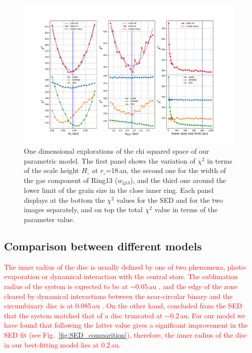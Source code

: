 \documentclass[fleqn,usenatbib,useAMS]{mnras}
\newcommand{\red}[1]{\textcolor{red}{#1}}
\begin{document}
\begin{figure}
	\includegraphics[width=\textwidth]{plot_chi_squared_all.pdf}
        \caption{One dimensional explorations of the chi squared space of our parametric model. The first panel shows the variation of $\chi^2$ in terms of the scale height $H_\circ$ at $r_\circ$=18\,au, the second one for the width of the gas component of Ring13 ($w_{\mathrm{g13}}$), and the third one around the lower limit of the grain size in the close inner ring. Each panel displays at the bottom the $\chi^2$ values for the SED and for the two images separately, and on top the total $\chi^2$ value in terms of the parameter value.}
    \label{fig:chi}
\end{figure}

\subsection{Comparison between different models}\label{sec:A2}

\red{The inner radius of the disc is usually defined by one of two phenomena, photo-evaporation or dynamical interaction with the central stars. The sublimation radius of the system is expected to be at $\sim$0.05\,au \citep[$R_{\mathrm{sub}}=0.07\sqrt{L_*(L_{\sun})}$,][]{Francis_2020}, and the edge of the zone cleared by dynamical interactions between the near-circular binary and the circumbinary disc is at 0.085\,au \citep[$r=2.08a$,][]{Art_Lu}. On the other hand, \citet{Jensen_97} concluded from the SED that the system matched that of a disc truncated at $\sim$0.2\,au. For our model we have found that following the latter value gives a significant improvement in the SED fit (see Fig.~\ref{fig:SED_comparition}), therefore, the inner radius of the disc in our best-fitting model lies at 0.2\,au.}
\end{document}
